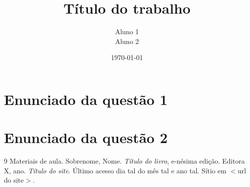 \documentclass[a4paper,10pt]{pee}
\title{Título do trabalho}
\author{Aluno 1\\Aluno 2}
\date{\today}
\begin{document}
\maketitle

\section{Enunciado da questão 1}
\lipsum[1-2]

\section{Enunciado da questão 2}
\lipsum[3-4]


\nocite{Otubo2007,Margareth}
\begin{thebibliography}{9}
 Materiais de aula.
 Sobrenome, Nome. \emph{Título do livro}, e-nésima edição. Editora X, ano.
 \emph{Título do site}. Último acesso dia tal do mês tal e ano tal. Sítio em $<$url do site$>$.
  
\end{thebibliography}
\end{document}
